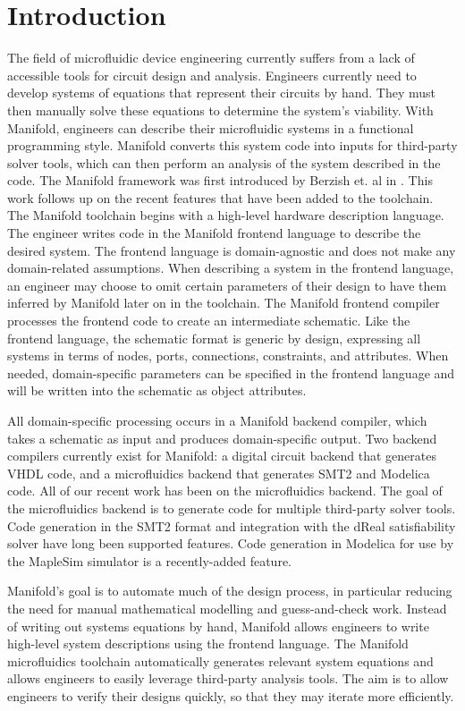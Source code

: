 \section{Introduction}

The field of microfluidic device engineering currently suffers from a lack of accessible tools for circuit design and analysis.
Engineers currently need to develop systems of equations that represent their circuits by hand.
They must then manually solve these equations to determine the system's viability.
With Manifold, engineers can describe their microfluidic systems in a functional programming style. 
Manifold converts this system code into inputs for third-party solver tools, which can then perform an analysis of the system described in the code.
The Manifold framework was first introduced by Berzish et. al in \cite{Berzish16cascon}.
This work follows up on the recent features that have been added to the toolchain.
The Manifold toolchain begins with a high-level hardware description language.
The engineer writes code in the Manifold frontend language to describe the desired system.
The frontend language is domain-agnostic and does not make any domain-related assumptions.
When describing a system in the frontend language, an engineer may choose to omit certain parameters of their design to have them inferred by Manifold later on in the toolchain.
The Manifold frontend compiler processes the frontend code to create an intermediate schematic.
Like the frontend language, the schematic format is generic by design, expressing all systems in terms of nodes, ports, connections, constraints, and attributes.
When needed, domain-specific parameters can be specified in the frontend language and will be written into the schematic as object attributes.

All domain-specific processing occurs in a Manifold backend compiler, which takes a schematic as input and produces domain-specific output.
Two backend compilers currently exist for Manifold: a digital circuit backend that generates VHDL code, and a microfluidics backend that generates SMT2 and Modelica code.
All of our recent work has been on the microfluidics backend.
The goal of the microfluidics backend is to generate code for multiple third-party solver tools.
Code generation in the SMT2 format and integration with the dReal satisfiability solver have long been supported features.
Code generation in Modelica for use by the MapleSim simulator is a recently-added feature.

Manifold's goal is to automate much of the design process, in particular reducing the need for manual mathematical modelling and guess-and-check work.
Instead of writing out systems equations by hand, Manifold allows engineers to write high-level system descriptions using the frontend language.
The Manifold microfluidics toolchain automatically generates relevant system equations and allows engineers to easily leverage third-party analysis tools.
The aim is to allow engineers to verify their designs quickly, so that they may iterate more efficiently.

